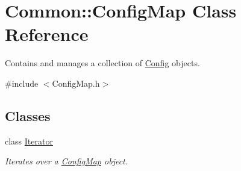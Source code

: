 \hypertarget{class_common_1_1_config_map}{\section{Common\-:\-:Config\-Map Class Reference}
\label{class_common_1_1_config_map}
}


Contains and manages a collection of \hyperlink{class_common_1_1_config}{Config} objects.  




{\ttfamily \#include $<$Config\-Map.\-h$>$}

\subsection*{Classes}
\begin{DoxyCompactItemize}
\item 
class \hyperlink{class_common_1_1_config_map_1_1_iterator}{Iterator}
\begin{DoxyCompactList}\small\item\em Iterates over a \hyperlink{class_common_1_1_config_map}{Config\-Map} object. \end{DoxyCompactList}\end{DoxyCompactItemize}
